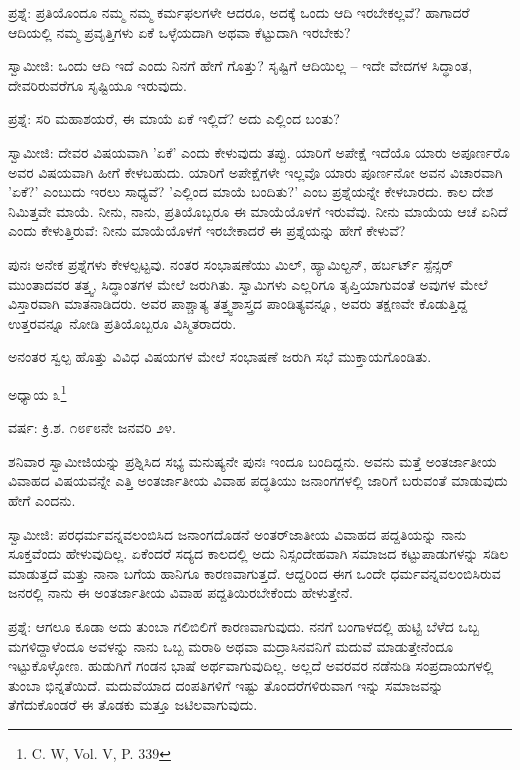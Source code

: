ಪ್ರಶ್ನೆ: ಪ್ರತಿಯೊಂದೂ ನಮ್ಮ ನಮ್ಮ ಕರ್ಮಫಲಗಳೇ ಆದರೂ, ಅದಕ್ಕೆ ಒಂದು ಆದಿ ಇರಬೇಕಲ್ಲವೆ? ಹಾಗಾದರೆ ಆದಿಯಲ್ಲಿ ನಮ್ಮ ಪ್ರವೃತ್ತಿಗಳು ಏಕೆ ಒಳ್ಳೆಯದಾಗಿ ಅಥವಾ ಕೆಟ್ಟುದಾಗಿ ಇರಬೇಕು?

ಸ್ವಾಮೀಜಿ: ಒಂದು ಆದಿ ಇದೆ ಎಂದು ನಿನಗೆ ಹೇಗೆ ಗೊತ್ತು? ಸೃಷ್ಟಿಗೆ ಆದಿಯಿಲ್ಲ – ಇದೇ ವೇದಗಳ ಸಿದ್ಧಾಂತ, ದೇವರಿರುವರೆಗೂ ಸೃಷ್ಟಿಯೂ ಇರುವುದು.

ಪ್ರಶ್ನೆ: ಸರಿ ಮಹಾಶಯರೆ, ಈ ಮಾಯೆ ಏಕೆ ಇಲ್ಲಿದೆ? ಅದು ಎಲ್ಲಿಂದ ಬಂತು?

ಸ್ವಾಮೀಜಿ: ದೇವರ ವಿಷಯವಾಗಿ 'ಏಕೆ' ಎಂದು ಕೇಳುವುದು ತಪ್ಪು. ಯಾರಿಗೆ ಅಪೇಕ್ಷೆ ಇದೆಯೊ ಯಾರು ಅಪೂರ್ಣರೊ ಅವರ ವಿಷಯವಾಗಿ ಹೀಗೆ ಕೇಳಬಹುದು. ಯಾರಿಗೆ ಅಪೇಕ್ಷೆಗಳೇ ಇಲ್ಲವೊ ಯಾರು ಪೂರ್ಣನೋ ಅವನ ವಿಚಾರವಾಗಿ 'ಏಕೆ?' ಎಂಬುದು ಇರಲು ಸಾಧ್ಯವೆ? 'ಎಲ್ಲಿಂದ ಮಾಯೆ ಬಂದಿತು?' ಎಂಬ ಪ್ರಶ್ನೆಯನ್ನೇ ಕೇಳಬಾರದು. ಕಾಲ ದೇಶ ನಿಮಿತ್ತವೇ ಮಾಯೆ. ನೀನು, ನಾನು, ಪ್ರತಿಯೊಬ್ಬರೂ ಈ ಮಾಯೆಯೊಳಗೆ ಇರುವೆವು. ನೀನು ಮಾಯೆಯ ಆಚೆ ಏನಿದೆ ಎಂದು ಕೇಳುತ್ತಿರುವೆ: ನೀನು ಮಾಯೆಯೊಳಗೆ ಇರಬೇಕಾದರೆ ಈ ಪ್ರಶ್ನೆಯನ್ನು ಹೇಗೆ ಕೇಳುವೆ?

ಪುನಃ ಅನೇಕ ಪ್ರಶ್ನೆಗಳು ಕೇಳಲ್ಪಟ್ಟವು. ನಂತರ ಸಂಭಾಷಣೆಯು ಮಿಲ್, ಹ್ಯಾಮಿಲ್ಟನ್, ಹರ್ಬರ್ಟ್ ಸ್ಪೆನ್ಸರ್ ಮುಂತಾದವರ ತತ್ತ್ವ, ಸಿದ್ಧಾಂತಗಳ ಮೇಲೆ ಜರುಗಿತು. ಸ್ವಾಮಿಗಳು ಎಲ್ಲರಿಗೂ ತೃಪ್ತಿಯಾಗುವಂತೆ ಅವುಗಳ ಮೇಲೆ ವಿಸ್ತಾರವಾಗಿ ಮಾತನಾಡಿದರು. ಅವರ ಪಾಶ್ಚಾತ್ಯ ತತ್ತ್ವಶಾಸ್ತ್ರದ ಪಾಂಡಿತ್ಯವನ್ನೂ, ಅವರು ತಕ್ಷಣವೇ ಕೊಡುತ್ತಿದ್ದ ಉತ್ತರವನ್ನೂ ನೋಡಿ ಪ್ರತಿಯೊಬ್ಬರೂ ವಿಸ್ಮಿತರಾದರು.

ಅನಂತರ ಸ್ವಲ್ಪ ಹೊತ್ತು ವಿವಿಧ ವಿಷಯಗಳ ಮೇಲೆ ಸಂಭಾಷಣೆ ಜರುಗಿ ಸಭೆ ಮುಕ್ತಾಯಗೊಂಡಿತು.

ಅಧ್ಯಾಯ ೩\protect\footnote{\enginline{*} C. W, Vol. V, P. 339}

\begin{center}
ವರ್ಷ: ಕ್ರಿ.ಶ. ೧೮೯೮ನೇ ಜನವರಿ ೨೪.
\end{center}

ಶನಿವಾರ ಸ್ವಾಮೀಜಿಯನ್ನು ಪ್ರಶ್ನಿಸಿದ ಸಭ್ಯ ಮನುಷ್ಯನೇ ಪುನಃ ಇಂದೂ ಬಂದಿದ್ದನು. ಅವನು ಮತ್ತೆ ಅಂತರ್ಜಾತೀಯ ವಿವಾಹದ ವಿಷಯವನ್ನೇ ಎತ್ತಿ ಅಂತರ್ಜಾತೀಯ ವಿವಾಹ ಪದ್ಧತಿಯು ಜನಾಂಗಗಳಲ್ಲಿ ಜಾರಿಗೆ ಬರುವಂತೆ ಮಾಡುವುದು ಹೇಗೆ ಎಂದನು.

ಸ್ವಾಮೀಜಿ: ಪರಧರ್ಮವನ್ನವಲಂಬಿಸಿದ ಜನಾಂಗದೊಡನೆ ಅಂತರ್‌ಜಾತೀಯ ವಿವಾಹದ ಪದ್ದತಿಯನ್ನು ನಾನು ಸೂಕ್ತವೆಂದು ಹೇಳುವುದಿಲ್ಲ. ಏಕೆಂದರೆ ಸದ್ಯದ ಕಾಲದಲ್ಲಿ ಅದು ನಿಸ್ಸಂದೇಹವಾಗಿ ಸಮಾಜದ ಕಟ್ಟುಪಾಡುಗಳನ್ನು ಸಡಿಲ ಮಾಡುತ್ತದೆ ಮತ್ತು ನಾನಾ ಬಗೆಯ ಹಾನಿಗೂ ಕಾರಣವಾಗುತ್ತದೆ. ಆದ್ದರಿಂದ ಈಗ ಒಂದೇ ಧರ್ಮವನ್ನವಲಂಬಿಸಿರುವ ಜನರಲ್ಲಿ ನಾನು ಈ ಅಂತರ್ಜಾತೀಯ ವಿವಾಹ ಪದ್ದತಿಯಿರಬೇಕೆಂದು ಹೇಳುತ್ತೇನೆ.

ಪ್ರಶ್ನೆ: ಆಗಲೂ ಕೂಡಾ ಅದು ತುಂಬಾ ಗಲಿಬಿಲಿಗೆ ಕಾರಣವಾಗುವುದು. ನನಗೆ ಬಂಗಾಳದಲ್ಲಿ ಹುಟ್ಟಿ ಬೆಳೆದ ಒಬ್ಬ ಮಗಳಿದ್ದಾಳೆಂದೂ ಅವಳನ್ನು ನಾನು ಒಬ್ಬ ಮರಾಠಿ ಅಥವಾ ಮದ್ರಾಸಿನವನಿಗೆ ಮದುವೆ ಮಾಡುತ್ತೇನೆಂದೂ ಇಟ್ಟುಕೊಳ್ಳೋಣ. ಹುಡುಗಿಗೆ ಗಂಡನ ಭಾಷೆ ಅರ್ಥವಾಗುವುದಿಲ್ಲ. ಅಲ್ಲದೆ ಅವರವರ ನಡೆನುಡಿ ಸಂಪ್ರದಾಯಗಳಲ್ಲಿ ತುಂಬಾ ಭಿನ್ನತೆಯಿದೆ. ಮದುವೆಯಾದ ದಂಪತಿಗಳಿಗೆ ಇಷ್ಟು ತೊಂದರೆಗಳಿರುವಾಗ ಇನ್ನು ಸಮಾಜವನ್ನು ತೆಗೆದುಕೊಂಡರೆ ಈ ತೊಡಕು ಮತ್ತೂ ಜಟಿಲವಾಗುವುದು.

